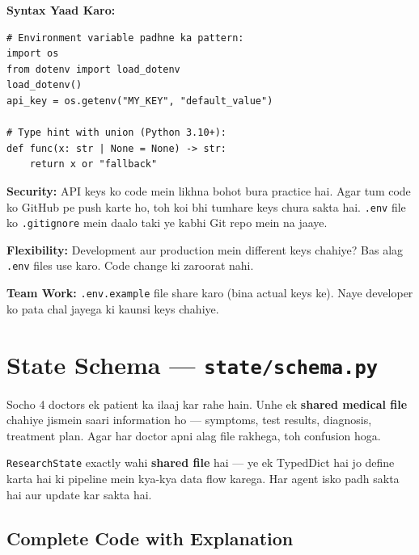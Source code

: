 \documentclass[12pt, a4paper]{article}
\begin{document}
\begin{notebox}
\textbf{Syntax Yaad Karo:}
\begin{lstlisting}[style=pythonstyle]
# Environment variable padhne ka pattern:
import os
from dotenv import load_dotenv
load_dotenv()
api_key = os.getenv("MY_KEY", "default_value")

# Type hint with union (Python 3.10+):
def func(x: str | None = None) -> str:
    return x or "fallback"
\end{lstlisting}
\end{notebox}

\begin{conceptbox}[title={\faIcon{brain} ~Why \texttt{.env} Files?}]
\textbf{Security:} API keys ko code mein likhna bohot bura practice hai. Agar tum code ko GitHub pe push karte ho, toh koi bhi tumhare keys chura sakta hai. \texttt{.env} file ko \texttt{.gitignore} mein daalo taki ye kabhi Git repo mein na jaaye.

\textbf{Flexibility:} Development aur production mein different keys chahiye? Bas alag \texttt{.env} files use karo. Code change ki zaroorat nahi.

\textbf{Team Work:} \texttt{.env.example} file share karo (bina actual keys ke). Naye developer ko pata chal jayega ki kaunsi keys chahiye.
\end{conceptbox}


\newpage
\section{State Schema --- \texttt{state/schema.py}}

\begin{storybox}
Socho 4 doctors ek patient ka ilaaj kar rahe hain. Unhe ek \textbf{shared medical file} chahiye jismein saari information ho --- symptoms, test results, diagnosis, treatment plan. Agar har doctor apni alag file rakhega, toh confusion hoga.

\texttt{ResearchState} exactly wahi \textbf{shared file} hai --- ye ek TypedDict hai jo define karta hai ki pipeline mein kya-kya data flow karega. Har agent isko padh sakta hai aur update kar sakta hai.
\end{storybox}

\subsection{Complete Code with Explanation}
\end{document}
